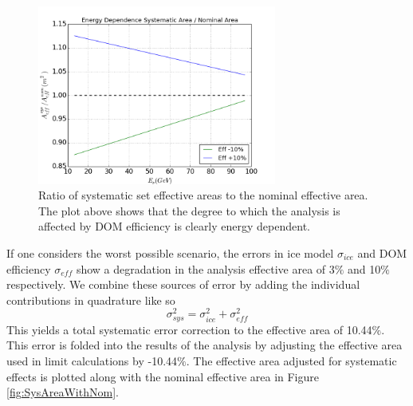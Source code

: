 \documentclass{gatech-thesis}
\begin{document}
\begin{figure}[ht]
  \begin{center}
    \includegraphics[width=0.7\textwidth,keepaspectratio]{GENIE_EffectiveAreaRatioTrend_DomEff.png}
  \end{center}
  \caption[DOM Efficiency Systematic Effective Area Ratio]{Ratio of systematic set effective areas to the nominal effective area. The plot above shows that the degree to which the analysis is affected by DOM efficiency is clearly energy dependent.}
  \label{fig:DOMEffEnergyTrend}
\end{figure}

If one considers the worst possible scenario, the errors in ice model $\sigma_{ice}$ and DOM efficiency $\sigma_{eff}$ show a degradation in the analysis effective area of 3$\%$ and 10$\%$ respectively. We combine these sources of error by adding the individual contributions in quadrature like so
\begin{equation}\label{eq:syserror}
\sigma_{sys}^2 = \sigma_{ice}^2 + \sigma_{eff}^2
\end{equation} 
This yields a total systematic error correction to the effective area of 10.44$\%$. This error is folded into the results of the analysis by adjusting the effective area used in limit calculations by -10.44$\%$. The effective area adjusted for systematic effects is plotted along with the nominal effective area in Figure \ref{fig:SysAreaWithNom}.
\end{document}
